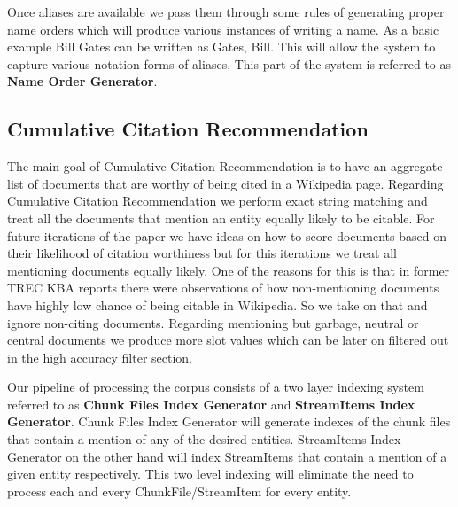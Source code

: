 Once aliases are available we pass them through some rules of generating proper name orders which will produce various instances of writing a name. As a basic example Bill Gates can be written as Gates, Bill. This will allow the system to capture various notation forms of aliases. This part of the system is referred to as \textbf{Name Order Generator}.

\subsection{Cumulative Citation Recommendation}

The main goal of Cumulative Citation Recommendation is to have an aggregate list of documents that are worthy of being cited in a Wikipedia page. Regarding Cumulative Citation Recommendation we perform exact string matching 
and treat all the documents that mention an entity equally likely to be citable.
For future iterations of the paper we have ideas on how to score documents 
based on their likelihood of citation worthiness but for this iterations we 
treat all mentioning documents equally likely. One of the reasons for this is 
that in former TREC KBA reports \cite{JFrank12} there were observations of how 
non-mentioning documents have highly low chance of being citable in Wikipedia.
So we take on that and ignore non-citing documents. Regarding mentioning but 
garbage, neutral or central documents we produce more slot values which can be 
later on filtered out in the high accuracy filter section.

Our pipeline of processing the corpus consists of a two layer indexing system referred to as \textbf{Chunk Files Index Generator} and \textbf{StreamItems Index Generator}.  Chunk Files Index Generator will generate indexes of the chunk files that contain a mention of any of the desired entities. StreamItems Index Generator on the other hand will index StreamItems that contain a mention of a given entity respectively. This two level indexing will eliminate the need to process each and every ChunkFile/StreamItem for every entity. 







